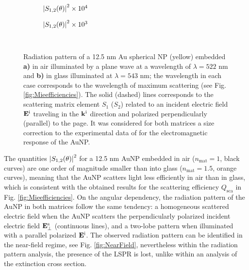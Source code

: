 \begin{figure}[t!]
	\small\centering
	\def\svgwidth{.9\textwidth}
		\vspace*{1.5em}
		\hspace*{-.25\textwidth}
	\begin{subfigure}{.45\textwidth}%
		\caption{$\abs{S_{1,2}(\theta)}^2\times 10^4$} \label{fig:ScatteringMaps:a}%
		\end{subfigure}%
	\begin{subfigure}{.45\textwidth}%
		\caption{$\abs{S_{1,2}(\theta)}^2\times 10^3$}\label{fig:ScatteringMaps:b}%
		\end{subfigure}%
	\vspace*{-4.5em}\\
	\vspace*{-.5em}
	\caption[Radiation Pattern of a 12.5 nm Au Spherical NP embedded in Air and Glass]{Radiation pattern of a 12.5 nm Au spherical NP (yellow) embedded \textbf{a)} in air illuminated by a plane wave at a wavelength of $\lambda = 522$ nm and \textbf{b)} in glass illuminated at $\lambda = 543$ nm; the wavelength in each case corresponds to the wavelength of maximum scattering (see Fig. \ref{fig:Mieefficiencies}). The solid (dashed) lines corresponds to the scattering matrix element $S_1$ ($S_2$) related to an incident electric field $\vb{E}^\text{i}$ traveling in the $\vb{k}^\text{i}$ direction  and polarized perpendicularly (parallel) to the page. It was considered for both matrices a size correction to the experimental data of \citeauthor{johnson_optical_1972} \cite{johnson_optical_1972} for the electromagnetic response of the AuNP.}%
	\label{fig:ScatteringMaps}
 \end{figure}

The quantities $\abs{S_{1,2}(\theta)}^2$ for a 12.5 nm AuNP embedded in air ($n_\text{mat} = 1$, black curves) are one order of magnitude smaller  than into glass ($n_\text{mat} = 1.5$, orange curves), meaning that the AuNP scatters light less efficiently in air than in glass, which is consistent with the obtained results for the scattering efficiency $Q_\text{sca}$ in Fig. \ref{fig:Mieefficiencies}. On the angular dependency, the radiation pattern of the AuNP in both matrices follow the same tendency: a homogeneous scattered electric field when the AuNP scatters the perpendicularly polarized incident electric field  $\vb{E}^\text{s}_\perp$ (continuous lines), and a two-lobe pattern when illuminated with a parallel polarized $\vb{E}^\text{i}$. The observed radiation pattern can be identified in the near-field regime, see Fig. \ref{fig:NearField}, nevertheless within the radiation pattern analysis, the presence of the LSPR is lost, unlike within an analysis of the extinction cross section.
